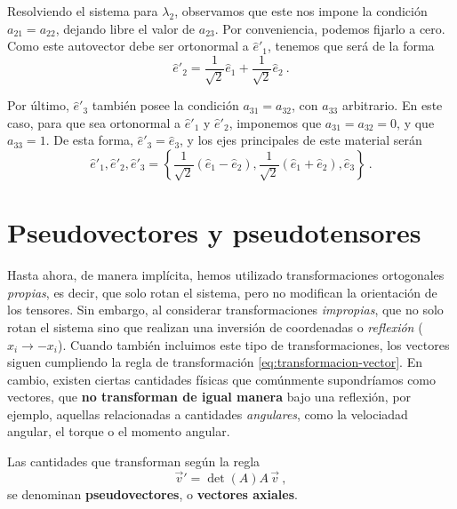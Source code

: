 \begin{ejemplo}
    Resolviendo el sistema para $\lambda_2$, observamos que este nos impone la condición $a_{21} = a_{22}$, dejando libre el valor de $a_{23}$. Por conveniencia, podemos fijarlo a cero. Como este autovector debe ser ortonormal a $\hat{e}'_1$, tenemos que será de la forma
    \begin{equation*}
        \hat{e}'_2 = \frac{1}{\sqrt{2}} \hat{e}_1 + \frac{1}{\sqrt{2}} \hat{e}_2 \ .
    \end{equation*}

    Por último, $\hat{e}'_3$ también posee la condición $a_{31} = a_{32}$, con $a_{33}$ arbitrario. En este caso, para que sea ortonormal a $\hat{e}'_1$ y $\hat{e}'_2$, imponemos que $a_{31} = a_{32} = 0$, y que $a_{33} = 1$. De esta forma, $\hat{e}'_3 = \hat{e}_3$, y los ejes principales de este material serán 
    \begin{equation*}
        {\hat{e}'_1, \hat{e}'_2, \hat{e}'_3} = \left\{ \frac{1}{\sqrt{2}}(\hat{e}_1 - \hat{e}_2), \frac{1}{\sqrt{2}}(\hat{e}_1 + \hat{e}_2), \hat{e}_3 \right\} \ .
    \end{equation*}
\end{ejemplo}


\section{Pseudovectores y pseudotensores}

Hasta ahora, de manera implícita, hemos utilizado transformaciones ortogonales \emph{propias}, es decir, que solo rotan el sistema, pero no modifican la orientación de los tensores. Sin embargo, al considerar transformaciones \emph{impropias}, que no solo rotan el sistema sino que realizan una inversión de coordenadas o \emph{reflexión} ($x_i \to -x_i$). Cuando también incluimos este tipo de transformaciones, los vectores siguen cumpliendo la regla de transformación \eqref{eq:transformacion-vector}. En cambio, existen ciertas cantidades físicas que comúnmente supondríamos como vectores, que \textbf{no transforman de igual manera} bajo una reflexión, por ejemplo, aquellas relacionadas a cantidades \emph{angulares}, como la velociadad angular, el torque o el momento angular.

\begin{defi} 
    Las cantidades que transforman según la regla
    \begin{equation} \label{eq:pseudovector}
        \vec{v}' = \det(A) A \, \vec{v} \ ,
    \end{equation}
    se denominan \textbf{pseudovectores}, o \textbf{vectores axiales}.
\end{defi}

